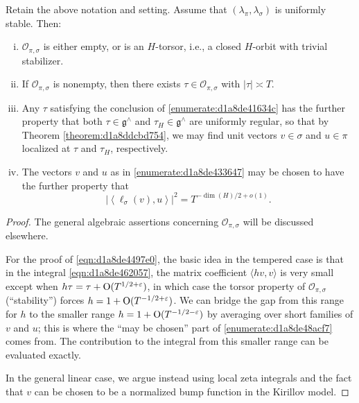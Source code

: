 \documentclass[reqno]{amsart} 
\numberwithin{equation}{section}
\numberwithin{theorem}{section}
\begin{document}
\begin{theorem}
  Retain the above notation and setting.  Assume that $(\lambda_\pi, \lambda_\sigma)$ is uniformly stable.  Then:
  \begin{enumerate}[(i)]
  \item $\mathcal{O}_{\pi,\sigma}$ is either empty, or is an $H$-torsor, i.e., a closed $H$-orbit with trivial stabilizer.
  \item\label{enumerate:d1a8de41634c} If $\mathcal{O}_{\pi,\sigma}$ is nonempty, then there exists $\tau \in \mathcal{O}_{\pi,\sigma}$ with $\lvert \tau \rvert \asymp T$.
  \item\label{enumerate:d1a8de433647} Any $\tau$ satisfying the conclusion of \eqref{enumerate:d1a8de41634c} has the further property that both $\tau \in \mathfrak{g}^\wedge$ and $\tau_H \in \mathfrak{g}^\wedge$ are uniformly regular, so that by Theorem \ref{theorem:d1a8ddcbd754}, we may find unit vectors $v \in \sigma$ and $u \in \pi$ localized at $\tau$ and $\tau_H$, respectively.
  \item\label{enumerate:d1a8de48acf7} The vectors $v$ and $u$ as in \eqref{enumerate:d1a8de433647} may be chosen to have the further property that
\begin{equation}\label{eqn:d1a8de4497e0}
\left\lvert \left\langle \ell_\sigma(v), u \right\rangle \right\rvert^2 = T^{-\dim(H)/2 + o(1)}.
\end{equation}    
  \end{enumerate}
\end{theorem}
\begin{proof}
  The general algebraic assertions concerning $\mathcal{O}_{\pi,\sigma}$ will be discussed elsewhere.

  For the proof of \eqref{eqn:d1a8de4497e0}, the basic idea in the tempered case is that in the integral \eqref{eqn:d1a8de462057}, the matrix coefficient $\langle h v, v \rangle$ is very small except when $h \tau = \tau + \operatorname{O}(T^{1/2+\varepsilon})$, in which case the torsor property of $\mathcal{O}_{\pi,\sigma}$ (``stability'') forces $h = 1 + \operatorname{O}(T^{-1/2+\varepsilon})$.  We can bridge the gap from this range for $h$ to the smaller range $h = 1 + \operatorname{O}(T^{-1/2-\varepsilon})$ by averaging over short families of $v$ and $u$; this is where the ``may be chosen'' part of \eqref{enumerate:d1a8de48acf7} comes from.  The contribution to the integral from this smaller range can be evaluated exactly.

  In the general linear case, we argue instead using local zeta integrals and the fact that $v$ can be chosen to be a normalized bump function in the Kirillov model.
\end{proof}





{} 
\end{document}
